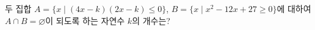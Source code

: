 두 집합 $A=\{x \mid (4x-k)(2x-k)\le 0\}$, $B=\{x \mid x^2-12x+27\ge 0\}$에 대하여 $A\cap B=\varnothing$이 되도록 하는 자연수 $k$의 개수는?
